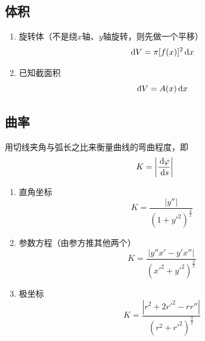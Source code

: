 \subsection{体积}
\begin{enumerate}
	\item 旋转体（不是绕$x$轴、$y$轴旋转，则先做一个平移）
\[\,\mathrm{d} V=\pi[f(x)]^2\,\mathrm{d} x\]
	\item 已知截面积
\[\,\mathrm{d} V=A(x)\,\mathrm{d} x\]
\end{enumerate}

\subsection{曲率}
\begin{definition}[曲率]
用切线夹角与弧长之比来衡量曲线的弯曲程度，即
\[K=\left|\dfrac{\,\mathrm{d}\varphi}{\,\mathrm{d} s}\right|\]
\end{definition}
\begin{enumerate}
	\item 直角坐标
	\[K=\dfrac{|y''|}{(1+y'^2)^\frac{3}{2}}\]
	\item 参数方程（由参方推其他两个）
	\[K=\dfrac{|y''x'-y'x''|}{(x'^2+y'^2)^\frac{3}{2}}\]
	\item 极坐标
	\[K=\dfrac{|r^2+2r'^2-rr''|}{(r^2+r'^2)^\frac{3}{2}}\]
\end{enumerate}

